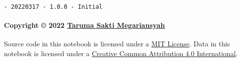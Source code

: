 \documentclass[11pt]{article}
\begin{document}
\begin{verbatim}
- 20220317 - 1.0.0 - Initial
\end{verbatim}

\hypertarget{copyright-2022-taruma-sakti-megariansyah}{%
\paragraph{\texorpdfstring{Copyright © 2022
\href{https://taruma.github.io}{Taruma Sakti
Megariansyah}}{Copyright © 2022 Taruma Sakti Megariansyah}}\label{copyright-2022-taruma-sakti-megariansyah}}

Source code in this notebook is licensed under a
\href{https://choosealicense.com/licenses/mit/}{MIT License}. Data in
this notebook is licensed under a
\href{https://creativecommons.org/licenses/by/4.0/}{Creative Common
Attribution 4.0 International}.


    
    
    
\end{document}
